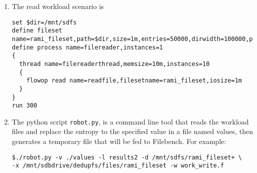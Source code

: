\begin{enumerate}
\item The read workload scenario is\\
\begin{lstlisting}
set $dir=/mnt/sdfs
define fileset name=rami_fileset,path=$dir,size=1m,entries=50000,dirwidth=100000,prealloc,datasource=entro,entropy=3.0
define process name=filereader,instances=1
{
  thread name=filereaderthread,memsize=10m,instances=10
  {
    flowop read name=readfile,filesetname=rami_fileset,iosize=1m
  }
}
run 300
\end{lstlisting}
\item The python script \verb+robot.py+, is a command line tool that reads the workload files and replace the entropy to the specified value in a file named values, then generates a temporary file that will be fed to Filebench. For example: \\
\lstset{language=bash}
\begin{lstlisting}
$./robot.py -v ./values -l results2 -d /mnt/sdfs/rami_fileset+ \
-x /mnt/sdbdrive/dedupfs/files/rami_fileset -w work_write.f
\end{lstlisting}
\end{enumerate}
